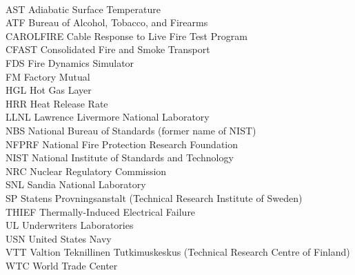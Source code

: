 \documentclass[11pt]{book}
\begin{document}
\begin{tabbing}
\hspace{1.5in} \= \\
AST \> Adiabatic Surface Temperature \\
ATF \> Bureau of Alcohol, Tobacco, and Firearms \\
CAROLFIRE \> Cable Response to Live Fire Test Program \\
CFAST \> Consolidated Fire and Smoke Transport \\
FDS \> Fire Dynamics Simulator \\
FM \> Factory Mutual \\
HGL \> Hot Gas Layer \\
HRR \> Heat Release Rate \\
LLNL \> Lawrence Livermore National Laboratory \\
NBS \> National Bureau of Standards (former name of NIST) \\
NFPRF \> National Fire Protection Research Foundation \\
NIST \> National Institute of Standards and Technology \\
NRC \> Nuclear Regulatory Commission \\
SNL \> Sandia National Laboratory \\
SP \>  Statens Provningsanstalt (Technical Research Institute of Sweden) \\
THIEF \> Thermally-Induced Electrical Failure \\
UL  \> Underwriters Laboratories \\
USN \> United States Navy \\
VTT \> Valtion Teknillinen Tutkimuskeskus (Technical Research Centre of Finland) \\
WTC \> World Trade Center \\
\end{tabbing}

\mainmatter





















\appendix


\end{document}
